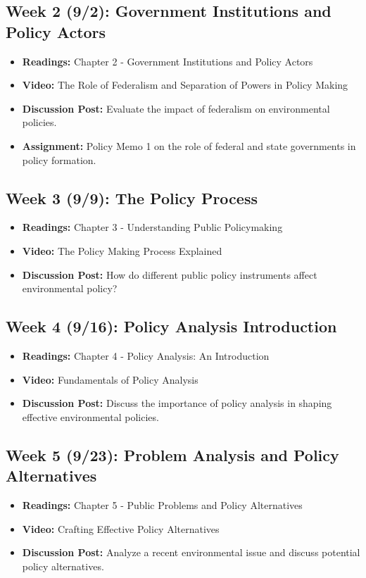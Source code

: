 \documentclass[12pt, letterpaper]{article}
\begin{document}
\subsection*{Week 2 (9/2): Government Institutions and Policy Actors}
\begin{itemize}
    \item \textbf{Readings:} Chapter 2 - Government Institutions and Policy Actors
    \item \textbf{Video:} The Role of Federalism and Separation of Powers in Policy Making
    \item \textbf{Discussion Post:} Evaluate the impact of federalism on environmental policies.
    \item \textbf{Assignment:} Policy Memo 1 on the role of federal and state governments in policy formation.
\end{itemize}

\subsection*{Week 3 (9/9): The Policy Process}
\begin{itemize}
    \item \textbf{Readings:} Chapter 3 - Understanding Public Policymaking
    \item \textbf{Video:} The Policy Making Process Explained
    \item \textbf{Discussion Post:} How do different public policy instruments affect environmental policy?
\end{itemize}

\subsection*{Week 4 (9/16): Policy Analysis Introduction}
\begin{itemize}
    \item \textbf{Readings:} Chapter 4 - Policy Analysis: An Introduction
    \item \textbf{Video:} Fundamentals of Policy Analysis
    \item \textbf{Discussion Post:} Discuss the importance of policy analysis in shaping effective environmental policies.
\end{itemize}

\subsection*{Week 5 (9/23): Problem Analysis and Policy Alternatives}
\begin{itemize}
    \item \textbf{Readings:} Chapter 5 - Public Problems and Policy Alternatives
    \item \textbf{Video:} Crafting Effective Policy Alternatives
    \item \textbf{Discussion Post:} Analyze a recent environmental issue and discuss potential policy alternatives.
\end{itemize}
\end{document}
